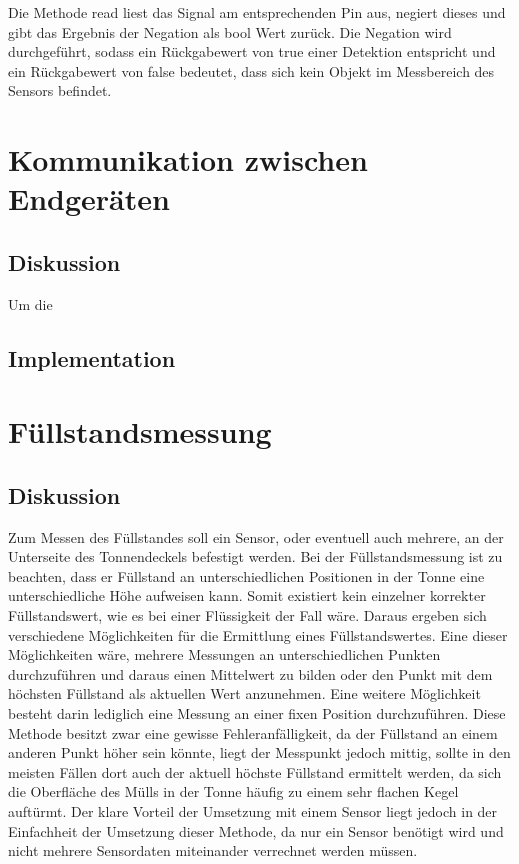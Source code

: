         Die Methode read liest das Signal am entsprechenden Pin aus, negiert dieses und gibt das Ergebnis der Negation als bool Wert zurück. Die Negation wird durchgeführt, sodass ein Rückgabewert von true einer Detektion entspricht und ein Rückgabewert von false bedeutet, dass sich kein Objekt im Messbereich des Sensors befindet.

\section{Kommunikation zwischen Endgeräten} \label{communications}

    \subsection{Diskussion}
        Um die 

    \subsection{Implementation}

\section{Füllstandsmessung}
    \subsection{Diskussion}
        Zum Messen des Füllstandes soll ein Sensor, oder eventuell auch mehrere, an der Unterseite des Tonnendeckels befestigt werden. Bei der Füllstandsmessung ist zu beachten, dass er Füllstand an unterschiedlichen Positionen in der Tonne eine unterschiedliche Höhe aufweisen kann. Somit existiert kein einzelner korrekter Füllstandswert, wie es bei einer Flüssigkeit der Fall wäre. Daraus ergeben sich verschiedene Möglichkeiten für die Ermittlung eines Füllstandswertes. Eine dieser Möglichkeiten wäre, mehrere Messungen an unterschiedlichen Punkten durchzuführen und daraus einen Mittelwert zu bilden oder den Punkt mit dem höchsten Füllstand als aktuellen Wert anzunehmen. Eine weitere Möglichkeit besteht darin lediglich eine Messung an einer fixen Position durchzuführen. Diese Methode besitzt zwar eine gewisse Fehleranfälligkeit, da der Füllstand an einem anderen Punkt höher sein könnte, liegt der Messpunkt jedoch mittig, sollte in den meisten Fällen dort auch der aktuell höchste Füllstand ermittelt werden, da sich die Oberfläche des Mülls in der Tonne häufig zu einem sehr flachen Kegel auftürmt. Der klare Vorteil der Umsetzung mit einem Sensor liegt jedoch in der Einfachheit der Umsetzung dieser Methode, da nur ein Sensor benötigt wird und nicht mehrere Sensordaten miteinander verrechnet werden müssen.\\
        
